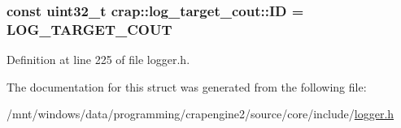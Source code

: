 \subsubsection[{I\+D}]{\setlength{\rightskip}{0pt plus 5cm}const uint32\+\_\+t crap\+::log\+\_\+target\+\_\+cout\+::\+I\+D = {\bf L\+O\+G\+\_\+\+T\+A\+R\+G\+E\+T\+\_\+\+C\+O\+U\+T}\hspace{0.3cm}{\ttfamily [static]}}\label{structcrap_1_1log__target__cout_a28042ea81a3466c87184a2c6c6cb2b02}


Definition at line 225 of file logger.\+h.



The documentation for this struct was generated from the following file\+:\begin{DoxyCompactItemize}
\item 
/mnt/windows/data/programming/crapengine2/source/core/include/\hyperlink{logger_8h}{logger.\+h}\end{DoxyCompactItemize}
